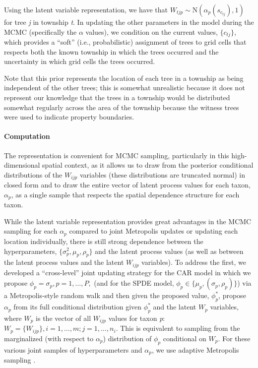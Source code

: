 \documentclass[10pt,letterpaper]{article}
\begin{document}
Using the latent variable representation, we have that $W_{tjp}\sim\mbox{N}(\alpha_{p}(s_{c_{tj}}),1)$
for tree \emph{j} in township \emph{t}. In updating the other parameters in
the model during the MCMC (specifically the $\alpha$ values), we
condition on the current values, $\{c_{tj}\}$, which provides a ``soft''
(i.e., probabilistic) assignment of trees to grid cells that respects
both the known township in which the trees occurred and the uncertainty
in which grid cells the trees occurred.

Note that this prior represents the location of each tree in a township
as being independent of the other trees; this is somewhat unrealistic
because it does not represent our knowledge that the trees in a township
would be distributed somewhat regularly across the area of the township
because the witness trees were used to indicate property boundaries.


\paragraph*{Computation}

The \cite{McCu:Ross:1994} representation is convenient for MCMC sampling,
particularly in this high-dimensional spatial context, as it allows
us to draw from the posterior conditional distributions of the $W_{ijp}$
variables (these distributions are truncated normal) in closed form
and to draw the entire vector of latent process values for each taxon,
$\alpha_{p}$, as a single sample that respects the spatial dependence
structure for each taxon.

While the latent variable representation provides great advantages
in the MCMC sampling for each $\alpha_{p}$ compared to joint Metropolis
updates or updating each location individually, there is still strong
dependence between the hyperparameters, $\{\sigma_{p}^{2},\mu_{p},\rho_{p}\}$
and the latent process values (as well as between the latent process
values and the latent $W_{ijp}$ variables). To address the first,
we developed a ``cross-level'' joint updating strategy for the CAR
model in which we propose $\phi_{p}=\sigma_{p},p=1,\ldots,P,$ (and
for the SPDE model, $\phi_{p}\in\{\mu_{p},(\sigma_{p},\rho_{p})\}$)
via a Metropolis-style random walk and then given the proposed value,
$\phi_{p}^{*}$, propose $\alpha_{p}$ from its full conditional distribution
given $\phi_{p}^{*}$ and the latent $W_{p}$ variables, where $W_{p}$
is the vector of all $W_{ijp}$ values for taxon \emph{p}: $W_{p}=\{W_{ijp}\},i=1,\ldots,m;j=1,\ldots,n_{i}$.
This is equivalent to sampling from the marginalized (with respect
to $\alpha_{p}$) distribution of $\phi_{p}$ conditional on $W_{p}$.
For these various joint samples of hyperparameters and $\alpha_{p}$,
we use adaptive Metropolis sampling \cite{Shab:Well:2011}.
\end{document}
